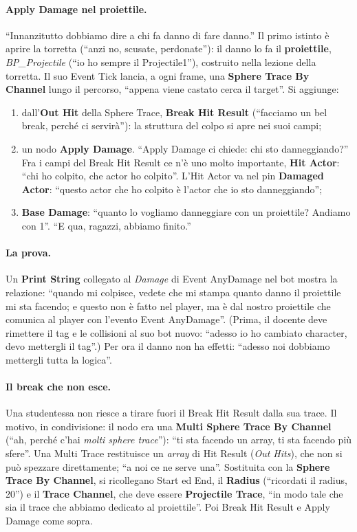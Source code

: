 \paragraph{Apply Damage nel proiettile.} ``Innanzitutto dobbiamo dire a chi fa danno di
fare danno.'' Il primo istinto è aprire la torretta (``anzi no, scusate, perdonate''): il
danno lo fa il \textbf{proiettile}, \emph{BP\_Projectile} (``io ho sempre il Projectile1''),
costruito nella lezione della torretta. Il suo Event Tick lancia, a ogni frame, una
\textbf{Sphere Trace By Channel} lungo il percorso, ``appena viene castato cerca il
target''. Si aggiunge:
\begin{enumerate}
  \item dall'\textbf{Out Hit} della Sphere Trace, \textbf{Break Hit Result} (``facciamo un
        bel break, perché ci servirà''): la struttura del colpo si apre nei suoi campi;
  \item un nodo \textbf{Apply Damage}. ``Apply Damage ci chiede: chi sto danneggiando?''
        Fra i campi del Break Hit Result ce n'è uno molto importante, \textbf{Hit Actor}:
        ``chi ho colpito, che actor ho colpito''. L'Hit Actor va nel pin \textbf{Damaged
        Actor}: ``questo actor che ho colpito è l'actor che io sto danneggiando'';
  \item \textbf{Base Damage}: ``quanto lo vogliamo danneggiare con un proiettile? Andiamo
        con 1''. ``E qua, ragazzi, abbiamo finito.''
\end{enumerate}

\paragraph{La prova.} Un \textbf{Print String} collegato al \emph{Damage} di Event
AnyDamage nel bot mostra la relazione: ``quando mi colpisce, vedete che mi stampa quanto
danno il proiettile mi sta facendo; e questo non è fatto nel player, ma è dal nostro
proiettile che comunica al player con l'evento Event AnyDamage''. (Prima, il docente deve
rimettere il tag e le collisioni al suo bot nuovo: ``adesso io ho cambiato character,
devo mettergli il tag''.) Per ora il danno non ha effetti: ``adesso noi dobbiamo
mettergli tutta la logica''.

\paragraph{Il break che non esce.} Una studentessa non riesce a tirare fuori il Break Hit
Result dalla sua trace. Il motivo, in condivisione: il nodo era una \textbf{Multi Sphere
Trace By Channel} (``ah, perché c'hai \emph{molti sphere trace}''): ``ti sta facendo un
array, ti sta facendo più sfere''. Una Multi Trace restituisce un \emph{array} di Hit
Result (\emph{Out Hits}), che non si può spezzare direttamente; ``a noi ce ne serve una''.
Sostituita con la \textbf{Sphere Trace By Channel}, si ricollegano Start ed End, il
\textbf{Radius} (``ricordati il radius, 20'') e il \textbf{Trace Channel}, che deve essere
\textbf{Projectile Trace}, ``in modo tale che sia il trace che abbiamo dedicato al
proiettile''. Poi Break Hit Result e Apply Damage come sopra.

